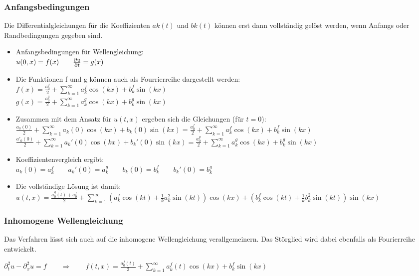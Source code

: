 \subsubsection{Anfangsbedingungen}
Die Differentialgleichungen für die Koeffizienten $ak(t)$ und $bk(t)$ können erst dann
vollständig gelöst werden, wenn Anfangs oder Randbedingungen gegeben sind.\\
\begin{itemize}
\item Anfangsbedingungen für Wellengleichung:\\
\quad $u(0,x)=f(x)\qquad \frac{\partial u}{\partial t}=g(x)$
\item Die Funktionen f und g können auch als Fourrierreihe dargestellt werden:\\
$f(x)=\frac{a_0^f}{2}+\sum\limits_{k=1}^{\infty}{a^f_k\cos(kx)+b^f_k\sin(kx)}$\\[0.2cm]
$g(x)=\frac{a_0^g}{2}+\sum\limits_{k=1}^{\infty}{a^g_k\cos(kx)+b^g_k\sin(kx)}$
\item Zusammen mit dem Ansatz für $u(t,x)$ ergeben sich die Gleichungen (für $t=0$):\\
$\frac{a_0(0)}{2}+\sum\limits_{k=1}^{\infty}{a_k(0)\cos(kx)+b_k(0)\sin(kx)}=\frac{a_0^f}{2}+\sum\limits_{k=1}^{\infty}{a_k^f\cos(kx)+b^f_k\sin(kx)}$\\[0.2cm]
$\frac{a'_0(0)}{2}+\sum\limits_{k=1}^{\infty}{a_k'(0)\cos(kx)+b_k'(0)\sin(kx)}=\frac{a_0^g}{2}+\sum\limits_{k=1}^{\infty}{a_k^g\cos(kx)+b^g_k\sin(kx)}$
\item Koeffizientenvergleich ergibt:\\
$a_k(0)=a_k^f\qquad a_k'(0)=a_k^g\qquad b_k(0)=b_k^f\qquad b_k'(0)=b_k^g$
\item Die vollständige Lösung ist damit:\\
$u(t,x)=\frac{a_0^g(t)+a_0^f}2+\sum\limits_{k=1}^{\infty}{\left(a_k^f\cos(kt)+\frac 1k a_k^2\sin(kt)\right)\cos(kx)+\left(b_k^f\cos(kt)+\frac 1k b_k^2\sin(kt)\right)}\sin(kx)$
\end{itemize}

\subsubsection{Inhomogene Wellengleichung}

Das Verfahren lässt sich auch auf die inhomogene Wellengleichung verallgemeinern. Das Störglied wird dabei ebenfalls als Fourierreihe entwickelt.

$\partial_t^2u-\partial_x^2u=f \qquad \Rightarrow \qquad f(t,x)=\frac{a_0^f(t)}{2}+\sum\limits_{k=1}^{\infty}{a^f_k(t)\cos(kx)+b^f_k\sin(kx)}$




